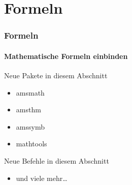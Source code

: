 \section{Formeln}
\begin{frame}
\frametitle{Formeln}
\framesubtitle{Mathematische Formeln einbinden}

\begin{exampleblock}{Neue Pakete in diesem Abschnitt}
\begin{multicols}{2}
\begin{itemize}
\item amsmath 
\item amsthm
\item amssymb
\item mathtools
\end{itemize}
\end{multicols}
\end{exampleblock}

\begin{block}{Neue Befehle in diesem Abschnitt}
\begin{multicols}{2}
\begin{itemize}
\item und viele mehr\ldots
\end{itemize}
\end{multicols}
\end{block}

\end{frame}

